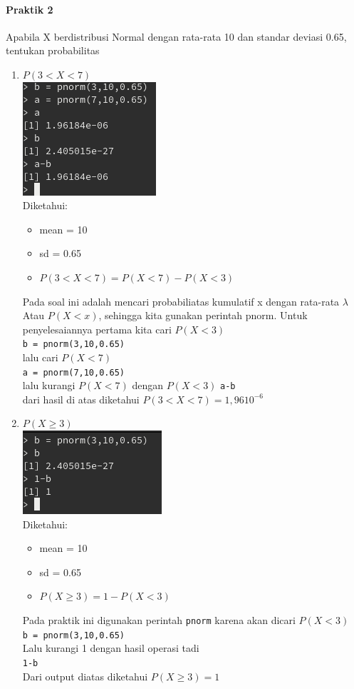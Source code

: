 \documentclass[a4paper,12pt]{article}
\begin{document}
\begin{enumerate}[label=\textbf{\Alph*.}]
\paragraph{Praktik 2\\}
Apabila X berdistribusi Normal dengan rata-rata 10 dan standar deviasi 0.65, tentukan probabilitas 
\begin{enumerate}
	\item $P(3 < X < 7)$\\
	\includegraphics{praka2a}\\
	Diketahui:
	\begin{itemize}
		\item mean = 10
		\item sd = 0.65 
		\item $P(3 < X < 7) = P(X < 7) - P(X < 3)$ 
	\end{itemize}
	Pada soal ini adalah mencari probabiliatas kumulatif x  dengan rata-rata $\lambda$
	Atau $P(X < x)$, sehingga kita gunakan perintah pnorm.
	Untuk penyelesaiannya pertama kita cari $P(X < 3)$\\
	\texttt{b = pnorm(3,10,0.65)}\\
	lalu cari $P(X < 7)$\\
	\texttt{a = pnorm(7,10,0.65)}\\
	lalu kurangi $P(X < 7)$ dengan $P(X < 3)$
	\texttt{a-b}\\
	dari hasil di atas diketahui $P(3 < X < 7) = 1,9610^{-6}$

    \item $P(X \geq 3)$\\
        \includegraphics{praka2b}\\
        Diketahui:
        \begin{itemize}
            \item mean = 10
            \item sd = 0.65 
            \item $P(X \geq 3) = 1 - P(X < 3)$ 
        \end{itemize} 
        Pada praktik ini digunakan perintah \texttt{pnorm} karena akan dicari $P(X < 3)$\\
        \texttt{b = pnorm(3,10,0.65)}\\
        Lalu kurangi 1 dengan hasil operasi tadi\\
        \texttt{1-b}\\
        Dari output diatas diketahui $P(X \geq 3) = 1$ 


\end{enumerate}
\end{enumerate}
\end{document}
